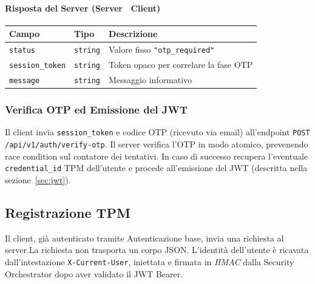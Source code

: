 \paragraph{Risposta del Server (Server \textrightarrow\ Client)}

\begin{center}
\begin{tabular}{@{}lll@{}}
\toprule
\textbf{Campo} & \textbf{Tipo} & \textbf{Descrizione} \\
\midrule
\texttt{status}         & \texttt{string} & Valore fisso \texttt{"otp\_required"} \\
\texttt{session\_token}  & \texttt{string} & Token opaco per correlare la fase OTP \\
\texttt{message}        & \texttt{string} & Messaggio informativo \\
\bottomrule
\end{tabular}
\end{center}

\subsubsection{Verifica OTP ed Emissione del JWT}

Il client invia \texttt{session\_token} e codice OTP (ricevuto via email)
all'endpoint \texttt{POST /api/v1/auth/verify-otp}. Il server verifica
l'OTP in modo atomico, prevenendo race condition sul contatore dei tentativi.
In caso di successo recupera l'eventuale \texttt{credential\_id} TPM
dell'utente e procede all'emissione del JWT (descritta nella
sezione~\ref{sec:jwt}).

\subsection{Registrazione TPM}

 Il client, già autenticato tramite Autenticazione base, invia una richiesta al server.La richiesta non trasporta un corpo JSON. L'identità dell'utente è
ricavata dall'intestazione \texttt{X-Current-User}, iniettata e firmata
in \emph{HMAC} dalla Security Orchestrator dopo aver validato il JWT Bearer.

